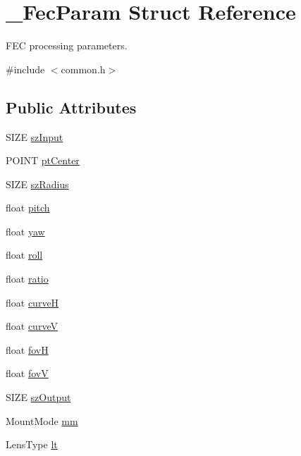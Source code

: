 \hypertarget{struct___fec_param}{}\section{\+\_\+\+Fec\+Param Struct Reference}
\label{struct___fec_param}


F\+EC processing parameters.  




{\ttfamily \#include $<$common.\+h$>$}

\subsection*{Public Attributes}
\begin{DoxyCompactItemize}
\item 
S\+I\+ZE \mbox{\hyperlink{struct___fec_param_aa83db363e7cdb88bf398152068f373fe}{sz\+Input}}
\item 
P\+O\+I\+NT \mbox{\hyperlink{struct___fec_param_a4a9ab36b8886d09177989d8f5ad4636b}{pt\+Center}}
\item 
S\+I\+ZE \mbox{\hyperlink{struct___fec_param_aa981a92a6da32125e1b044dff603df4e}{sz\+Radius}}
\item 
float \mbox{\hyperlink{struct___fec_param_ac5bc4b6bb2ff5381458001e7106b0db7}{pitch}}
\item 
float \mbox{\hyperlink{struct___fec_param_a420253746bf3b988571baff716521f50}{yaw}}
\item 
float \mbox{\hyperlink{struct___fec_param_a519744a92fa4b5f27d8e80f4cac6d029}{roll}}
\item 
float \mbox{\hyperlink{struct___fec_param_a72350a015193ca8450c7a87f315028a4}{ratio}}
\item 
float \mbox{\hyperlink{struct___fec_param_a25e29757d04be1e6b7b1cf8709670d49}{curveH}}
\item 
float \mbox{\hyperlink{struct___fec_param_aa254903d8631ae012dc4c3d4b0ab3969}{curveV}}
\item 
float \mbox{\hyperlink{struct___fec_param_acc8b9b08bfeabd57a76ac89e7bac4a59}{fovH}}
\item 
float \mbox{\hyperlink{struct___fec_param_a5f4a6533e68132c4a9d7fdbde282ed28}{fovV}}
\item 
S\+I\+ZE \mbox{\hyperlink{struct___fec_param_a8012431882fcb79b1e4ec3291fd24f56}{sz\+Output}}
\item 
Mount\+Mode \mbox{\hyperlink{struct___fec_param_af218d4cb5ba8a680830dced86a4e1d31}{mm}}
\item 
Lens\+Type \mbox{\hyperlink{struct___fec_param_a91947fce0433e75078979f4a1b0ebc81}{lt}}
\end{DoxyCompactItemize}


